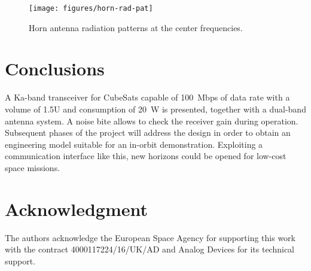 \documentclass[conference,10pt,a4paper]{IEEEtran}%
\begin{document}

\begin{figure}[tb]
	\centering
	\texttt{[image: figures/horn-rad-pat]}
	\caption{Horn antenna radiation patterns at the center frequencies.}
	\label{fig:rad-pat}
\end{figure}

\section{Conclusions}
\label{sec:con}
A Ka-band transceiver for CubeSats capable of \SI{100}{Mbps} of data rate with a volume of 1.5U and consumption of \SI{20}{W} is presented, together with a dual-band antenna system.
A noise \ac{bite} allows to check the receiver gain during operation.
Subsequent phases of the project will address the design in order to obtain an engineering model suitable for an in-orbit demonstration.
Exploiting a communication interface like this, new horizons could be opened for low-cost space missions.

\section*{Acknowledgment}
The authors acknowledge the European Space Agency for supporting this work with the contract 4000117224/16/UK/AD and Analog Devices for its technical support.



\end{document}
